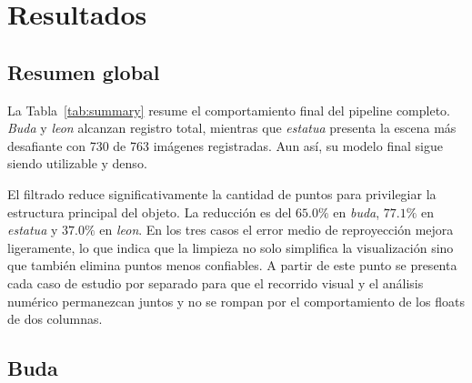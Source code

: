 \documentclass[conference]{IEEEtran}
\begin{document}
\section{Resultados}\label{sec:results}

\subsection{Resumen global}

La Tabla~\ref{tab:summary} resume el comportamiento final del pipeline completo. \emph{Buda} y \emph{leon} alcanzan registro total, mientras que \emph{estatua} presenta la escena m\'as desafiante con 730 de 763 im\'agenes registradas. Aun as\'i, su modelo final sigue siendo utilizable y denso.

\begin{table}[!t]
\caption{Resumen global de las reconstrucciones finales.}
\label{tab:summary}
\centering
\scriptsize
{}
\end{table}

El filtrado reduce significativamente la cantidad de puntos para privilegiar la estructura principal del objeto. La reducci\'on es del \(65.0\%\) en \emph{buda}, \(77.1\%\) en \emph{estatua} y \(37.0\%\) en \emph{leon}. En los tres casos el error medio de reproyecci\'on mejora ligeramente, lo que indica que la limpieza no solo simplifica la visualizaci\'on sino que tambi\'en elimina puntos menos confiables. A partir de este punto se presenta cada caso de estudio por separado para que el recorrido visual y el an\'alisis num\'erico permanezcan juntos y no se rompan por el comportamiento de los floats de dos columnas.

\subsection{Buda}
\end{document}

